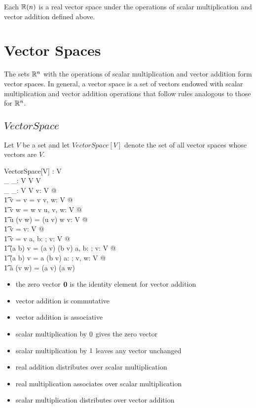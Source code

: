 \documentclass[11pt, oneside]{article}
\begin{document}
Each $\mathbb{R}(n)$ is a real vector space under the operations of scalar multiplication and vector addition
defined above. 

\section{Vector Spaces}

The sets $\mathbb{R}^n$ with the operations of scalar multiplication and vector addition form vector spaces.
In general, a vector space is a set of vectors endowed with scalar multiplication and vector addition operations that
follow rules analogous to those for $\mathbb{R}^n$.

\subsection{$VectorSpace$}

Let $V$ be a set and let $VectorSpace[V]$ denote the set of all vector spaces whose vectors are $V$.

\begin{schema}{VectorSpace}[V]
	\zeroV: V \\
	\_ \addV \_: V \cross V \fun V \\
	\_ \smulV \_: \R \cross V \fun V
\where
	\forall v: V @ \\
	\t1	\zeroV \addV v = v = v \addV \zeroV
\also
	\forall v, w: V @ \\
	\t1	v \addV w = w \addV v
\also
	\forall u, v, w: V @ \\
	\t1	u \addV (v \addV w) = (u \addV v) \addV w
\also
	\forall v: V @ \\
	\t1	\zeroR \smulV v = \zeroV
\also
	\forall v: V @ \\
	\t1	\oneR \smulV v = v
\also
	\forall a, b: \R; v: V @ \\
	\t1	(a \addR b) \smulV v = (a \smulV v) \addV (b \smulV v)
\also
	\forall a, b: \R; v: V @ \\
	\t1	(a \mulR b) \smulV v = a \smulV (b \smulV v)
\also
	\forall a: \R; v, w: V @ \\
	\t1	a \smulV (v \addV w) = (a \smulV v) \addV (a \smulV w)
\end{schema}
\begin{itemize}
	\item the zero vector $\mathbf{0}$ is the identity element for vector addition
	\item vector addition is commutative
	\item vector addition is associative
	\item scalar multiplication by $0$ gives the zero vector
	\item scalar multiplication by $1$ leaves any vector unchanged
	\item real addition distributes over scalar multiplication
	\item real multiplication associates over scalar multiplication
	\item scalar multiplication distributes over vector addition
\end{itemize}
\end{document}
